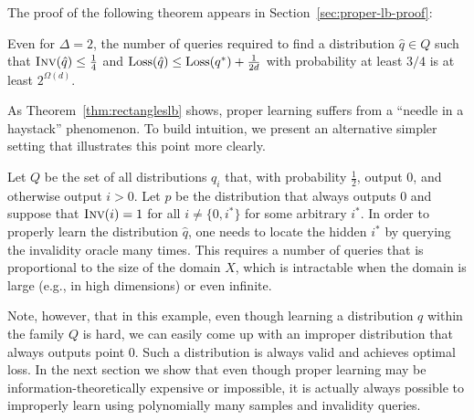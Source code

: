 The proof of the following theorem appears in Section~\ref{sec:proper-lb-proof}:
\begin{theorem}\label{thm:rectangleslb}
  Even for $\Delta = 2$, the number of queries required to find a distribution $\hat q \in Q$ such that $\textsc{Inv}(\hat q) \le \frac 1 4$ and 
  $\text{Loss}(\hat q) \le \text{Loss}(q^*) + \frac 1 {2 d}$ with probability at least $3/4$ is at least $2^{\Omega(d)}$.
\end{theorem}

As Theorem~\ref{thm:rectangleslb} shows, proper learning suffers from a ``needle in a haystack'' phenomenon. To build intuition, we present an alternative simpler setting that illustrates this point more clearly.

Let $Q$ be the set of all distributions $q_i$ that, with probability $\frac12$, output $0$, and otherwise output $i>0$. 
Let $p$ be the distribution that always outputs $0$ and suppose that $\textsc{Inv}(i)=1$ for all $i \neq \{0,i^*\}$ for some arbitrary $i^*$. 
In order to properly learn the distribution $\hat q$, one needs to locate the hidden $i^*$ by querying the invalidity oracle many times. This requires a number of queries that is proportional to the size of the domain $X$, which is intractable when the domain is large (e.g., in high dimensions) or even infinite.

Note, however, that in this example, even though learning a distribution $q$ within the family $Q$ is hard, we can easily come up with an improper distribution that always outputs point $0$. Such a distribution is always valid and achieves optimal loss. In the next section we show that even though proper learning may be information-theoretically expensive or impossible, it is actually always possible to improperly learn using polynomially many samples and invalidity queries.
